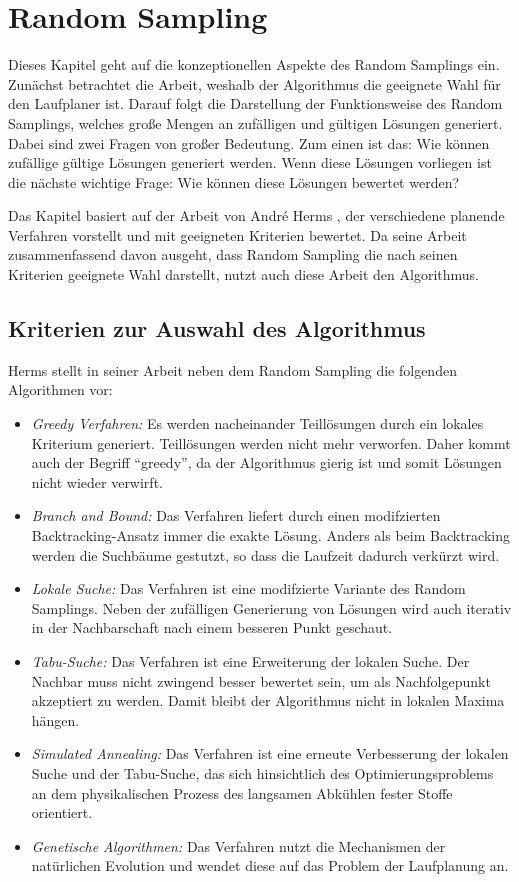 \chapter{Random Sampling}
\label{kap3}

Dieses Kapitel geht auf die konzeptionellen Aspekte des Random Samplings ein. Zunächst betrachtet die Arbeit, weshalb der Algorithmus die geeignete Wahl für den Laufplaner ist. Darauf folgt die Darstellung der Funktionsweise des Random Samplings, welches große Mengen an zufälligen und gültigen Lösungen generiert.  Dabei sind zwei Fragen von großer Bedeutung. Zum einen ist das: Wie können zufällige gültige Lösungen generiert werden. Wenn diese Lösungen vorliegen ist die nächste wichtige Frage: Wie können diese Lösungen bewertet werden?

Das Kapitel basiert auf der Arbeit von André Herms \autocite{herms2004}, der verschiedene planende Verfahren vorstellt und mit geeigneten Kriterien bewertet. Da seine Arbeit zusammenfassend davon ausgeht, dass Random Sampling die nach seinen Kriterien geeignete Wahl darstellt, nutzt auch diese Arbeit den Algorithmus.

\section{Kriterien zur Auswahl des Algorithmus}

Herms stellt in seiner Arbeit neben dem Random Sampling die folgenden Algorithmen vor:
\begin{itemize}
  \item \emph{Greedy Verfahren:} Es werden nacheinander Teillösungen durch ein lokales Kriterium generiert. Teillösungen werden nicht mehr verworfen. Daher kommt auch der Begriff "`greedy"', da der Algorithmus gierig ist und somit Lösungen nicht wieder verwirft.
  \item \emph{Branch and Bound:} Das Verfahren liefert durch einen modifzierten Backtracking-Ansatz immer die exakte Lösung. Anders als beim Backtracking werden die Suchbäume gestutzt, so dass die Laufzeit dadurch verkürzt wird.
  \item \emph{Lokale Suche:} Das Verfahren ist eine modifzierte Variante des Random Samplings. Neben der zufälligen Generierung von Lösungen wird auch iterativ in der Nachbarschaft nach einem besseren Punkt geschaut.
  \item \emph{Tabu-Suche:} Das Verfahren ist eine Erweiterung der lokalen Suche. Der Nachbar muss nicht zwingend besser bewertet sein, um als Nachfolgepunkt akzeptiert zu werden. Damit bleibt der Algorithmus nicht in lokalen Maxima hängen.
  \item \emph{Simulated Annealing:} Das Verfahren ist eine erneute Verbesserung der lokalen Suche und der Tabu-Suche, das sich hinsichtlich des Optimierungsproblems an dem physikalischen Prozess des langsamen Abkühlen fester Stoffe orientiert.
  \item \emph{Genetische Algorithmen:} Das Verfahren nutzt die Mechanismen der natürlichen Evolution und wendet diese auf das Problem der Laufplanung an.
\end{itemize}

